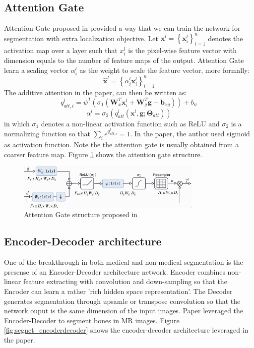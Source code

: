 
\subsection{Attention Gate}
Attention Gate proposed in \cite{Attention_gate_network} provided a way that we can train the network for segmentation with extra localization objective.
Let $\mathbf{x}^{l}=\left\{\mathbf{x}_{i}^{l}\right\}_{i=1}^{n}$ denotes the activation map over a layer such that $x_{i}^{l}$ is the pixel-wise feature vector with dimension equals to the number of feature maps of the output. Attention Gate learn a scaling vector $\alpha_{i}^{l}$ as the weight to scale the feature vector, more formally:
$$\hat{\mathbf{x}}^{l}=\left\{\alpha_{i}^{l} \mathbf{x}_{i}^{l}\right\}_{i=1}^{n}$$
The additive attention in the paper, can then be written as:
$$q_{a t t, i}^{l}=\psi^{T}\left(\sigma_{1}\left(\boldsymbol{W}_{x}^{T} \boldsymbol{x}_{i}^{l}+\boldsymbol{W}_{g}^{T} \boldsymbol{g}+\boldsymbol{b}_{x g}\right)\right)+b_{\psi}$$
$$\alpha^{l}=\sigma_{2}\left(q_{a t t}^{l}\left(\boldsymbol{x}^{l}, \boldsymbol{g} ; \boldsymbol{\Theta}_{a t t}\right)\right)$$
in which $\sigma_{1}$ denotes a non-linear activation function such as ReLU and $\sigma_{2}$ is a normalizing function so that $\sum_{i} e^{q_{a t t, i}^{l}} = 1$. In the paper, the author used sigmoid as activation function. Note the the attention gate is usually obtained from a coarser feature map. Figure \ref{fig:att_gate} shows the attention gate structure.

\begin{figure}
\centering
\includegraphics[width = 0.8\textwidth]{img/background_img/attention_gate}
\caption{Attention Gate structure proposed in \cite{Attention_gate_network}}
\label{fig:att_gate}
\end{figure}


\subsection{Encoder-Decoder architecture}
One of the breakthrough in both medical and non-medical segmentation is the presense of an Encoder-Decoder architecture network. Encoder combines non-linear feature extracting with convolution and down-sampling so that the Encoder can learn a rather 'rich hidden space representation'. The Decoder generates segmentation through upsamle or transpose convolution so that the network ouput is the same dimension of the input images. Paper \cite{Liu2018DeepCN} leveraged the Encoder-Decoder to segment bones in MR images. Figure \ref{fig:segnet_encoderdecoder} shows the encoder-decoder architecture leveraged in the paper.

